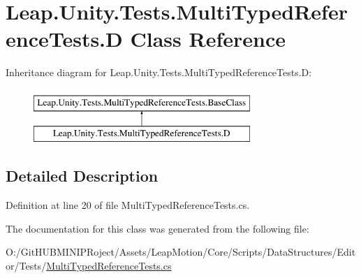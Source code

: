 \hypertarget{class_leap_1_1_unity_1_1_tests_1_1_multi_typed_reference_tests_1_1_d}{}\section{Leap.\+Unity.\+Tests.\+Multi\+Typed\+Reference\+Tests.\+D Class Reference}
\label{class_leap_1_1_unity_1_1_tests_1_1_multi_typed_reference_tests_1_1_d}
Inheritance diagram for Leap.\+Unity.\+Tests.\+Multi\+Typed\+Reference\+Tests.\+D\+:\begin{figure}[H]
\begin{center}
\leavevmode
\includegraphics[height=2.000000cm]{class_leap_1_1_unity_1_1_tests_1_1_multi_typed_reference_tests_1_1_d}
\end{center}
\end{figure}


\subsection{Detailed Description}


Definition at line 20 of file Multi\+Typed\+Reference\+Tests.\+cs.



The documentation for this class was generated from the following file\+:\begin{DoxyCompactItemize}
\item 
O\+:/\+Git\+H\+U\+B\+M\+I\+N\+I\+P\+Roject/\+Assets/\+Leap\+Motion/\+Core/\+Scripts/\+Data\+Structures/\+Editor/\+Tests/\mbox{\hyperlink{_multi_typed_reference_tests_8cs}{Multi\+Typed\+Reference\+Tests.\+cs}}\end{DoxyCompactItemize}
